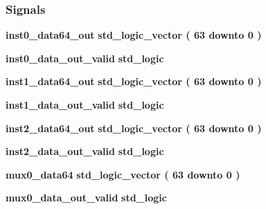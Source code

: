 \subsubsection*{Signals}
 \begin{DoxyCompactItemize}
\item 
{\bf inst0\+\_\+data64\+\_\+out} {\bfseries \textcolor{comment}{std\+\_\+logic\+\_\+vector}\textcolor{vhdlchar}{ }\textcolor{vhdlchar}{(}\textcolor{vhdlchar}{ }\textcolor{vhdlchar}{ } \textcolor{vhdldigit}{63} \textcolor{vhdlchar}{ }\textcolor{keywordflow}{downto}\textcolor{vhdlchar}{ }\textcolor{vhdlchar}{ } \textcolor{vhdldigit}{0} \textcolor{vhdlchar}{ }\textcolor{vhdlchar}{)}\textcolor{vhdlchar}{ }} 
\item 
{\bf inst0\+\_\+data\+\_\+out\+\_\+valid} {\bfseries \textcolor{comment}{std\+\_\+logic}\textcolor{vhdlchar}{ }} 
\item 
{\bf inst1\+\_\+data64\+\_\+out} {\bfseries \textcolor{comment}{std\+\_\+logic\+\_\+vector}\textcolor{vhdlchar}{ }\textcolor{vhdlchar}{(}\textcolor{vhdlchar}{ }\textcolor{vhdlchar}{ } \textcolor{vhdldigit}{63} \textcolor{vhdlchar}{ }\textcolor{keywordflow}{downto}\textcolor{vhdlchar}{ }\textcolor{vhdlchar}{ } \textcolor{vhdldigit}{0} \textcolor{vhdlchar}{ }\textcolor{vhdlchar}{)}\textcolor{vhdlchar}{ }} 
\item 
{\bf inst1\+\_\+data\+\_\+out\+\_\+valid} {\bfseries \textcolor{comment}{std\+\_\+logic}\textcolor{vhdlchar}{ }} 
\item 
{\bf inst2\+\_\+data64\+\_\+out} {\bfseries \textcolor{comment}{std\+\_\+logic\+\_\+vector}\textcolor{vhdlchar}{ }\textcolor{vhdlchar}{(}\textcolor{vhdlchar}{ }\textcolor{vhdlchar}{ } \textcolor{vhdldigit}{63} \textcolor{vhdlchar}{ }\textcolor{keywordflow}{downto}\textcolor{vhdlchar}{ }\textcolor{vhdlchar}{ } \textcolor{vhdldigit}{0} \textcolor{vhdlchar}{ }\textcolor{vhdlchar}{)}\textcolor{vhdlchar}{ }} 
\item 
{\bf inst2\+\_\+data\+\_\+out\+\_\+valid} {\bfseries \textcolor{comment}{std\+\_\+logic}\textcolor{vhdlchar}{ }} 
\item 
{\bf mux0\+\_\+data64} {\bfseries \textcolor{comment}{std\+\_\+logic\+\_\+vector}\textcolor{vhdlchar}{ }\textcolor{vhdlchar}{(}\textcolor{vhdlchar}{ }\textcolor{vhdlchar}{ } \textcolor{vhdldigit}{63} \textcolor{vhdlchar}{ }\textcolor{keywordflow}{downto}\textcolor{vhdlchar}{ }\textcolor{vhdlchar}{ } \textcolor{vhdldigit}{0} \textcolor{vhdlchar}{ }\textcolor{vhdlchar}{)}\textcolor{vhdlchar}{ }} 
\item 
{\bf mux0\+\_\+data\+\_\+out\+\_\+valid} {\bfseries \textcolor{comment}{std\+\_\+logic}\textcolor{vhdlchar}{ }} 

\end{DoxyCompactItemize}
